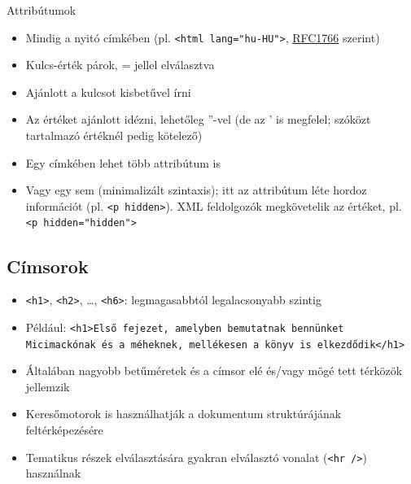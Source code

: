 \documentclass[usenames,dvipsnames,aspectratio=169]{beamer}
\newcommand{\kiemel}[1]{{\color{kiemelesszin}#1}}
\newcommand{\hiv}[1]{{\color{hivatkozasszin}#1}}
\begin{document}
\begin{frame}
  Attribútumok
  \begin{itemize}
    \item Mindig a nyitó címkében (pl. \texttt{<html lang="hu-HU">}, \hiv{\href{http://www.ietf.org/rfc/rfc1766.txt}{RFC1766}} szerint)
    \item Kulcs-érték párok, = jellel elválasztva
    \item \kiemel{Ajánlott} a kulcsot kisbetűvel írni
    \item Az értéket \kiemel{ajánlott} idézni, lehetőleg ''-vel (de az ' is megfelel; szóközt tartalmazó értéknél pedig kötelező)
    \item Egy címkében lehet több attribútum is
    \item Vagy egy sem (minimalizált szintaxis); itt az attribútum léte hordoz információt (pl. \texttt{<p hidden>}). XML feldolgozók megkövetelik az értéket, pl. \texttt{<p~hidden="hidden">}
  \end{itemize}
\end{frame}

\subsection{Címsorok}

\begin{frame}
  \begin{itemize}
    \item \texttt{<h1>}, \texttt{<h2>}, \dots, \texttt{<h6>}: legmagasabbtól legalacsonyabb szintig
    \item Például: \texttt{<h1>Első fejezet, amelyben bemutatnak bennünket Micimackónak és a méheknek, mellékesen a könyv is elkezdődik</h1>}
    \item Általában nagyobb betűméretek és a címsor elé és/vagy mögé tett térközök jellemzik
    \item Keresőmotorok is használhatják a dokumentum struktúrájának feltérképezésére
    \item Tematikus részek elválasztására gyakran elválasztó vonalat (\texttt{<hr />}) használnak
  \end{itemize}
\end{frame}
\end{document}
